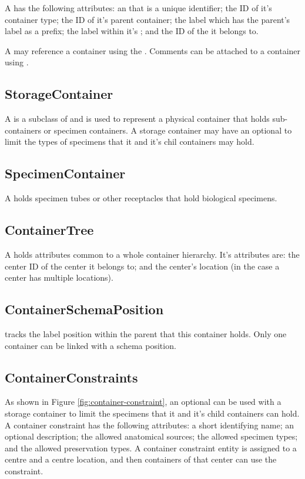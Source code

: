 A  has the following attributes: an
 that is a unique identifier; the ID of it's container
type; the ID of it's parent container; the label which has the parent's label
as a prefix; the label within it's ; and
the ID of the  it belongs to.

A  may reference a container using the
. Comments can be attached to a container using
.

\subsection*{StorageContainer}
A  is a subclass of  and is
used to represent a physical container that holds sub-containers or specimen
containers. A storage container may have an optional
 to limit the types of specimens that it and
it's chil containers may hold.

\subsection*{SpecimenContainer}
A  holds specimen tubes or other receptacles that
hold biological specimens.

\subsection*{ContainerTree}
A  holds attributes common to a whole container
hierarchy. It's attributes are: the center ID of the center it belongs to; and
the center's location (in the case a center has multiple locations).

\subsection*{ContainerSchemaPosition}
 tracks the label position within the
parent that this container holds. Only one container can be linked with a
schema position.

\subsection*{ContainerConstraints}
As shown in Figure \ref{fig:container-constraint}, an optional
 can be used with a storage container to limit
the specimens that it and it's child containers can hold. A container
constraint has the following attributes: a short identifying name; an optional
description; the allowed anatomical sources; the allowed specimen types; and
the allowed preservation types. A container constraint entity is assigned to a
centre and a centre location, and then containers of that center can use the
constraint.


